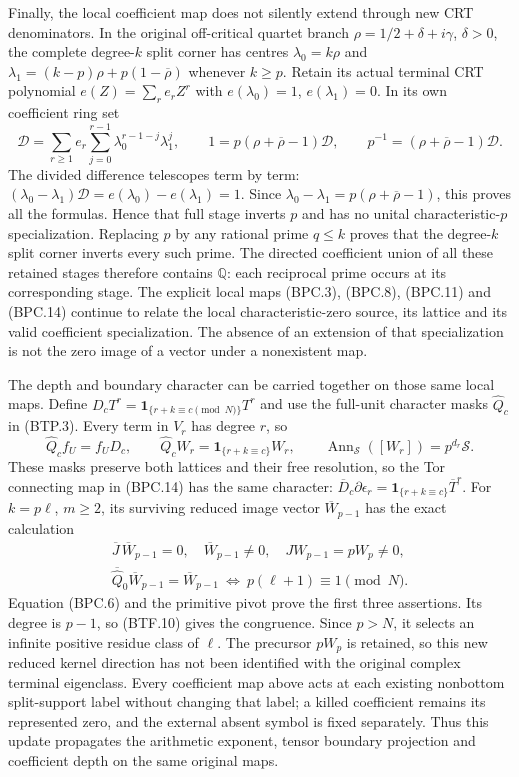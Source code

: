 Finally, the local coefficient map does not
silently extend through new CRT denominators.
In the original off-critical quartet branch
\(\rho=1/2+\delta+i\gamma\), \(\delta>0\),
the complete degree-\(k\) split corner has
centres \(\lambda_0=k\rho\) and
\(\lambda_1=(k-p)\rho+p(1-\overline\rho)\)
whenever \(k\geq p\).  Retain its actual
terminal CRT polynomial \(e(Z)=\sum_r e_rZ^r\)
with \(e(\lambda_0)=1\), \(e(\lambda_1)=0\).
In its own coefficient ring set
\[
 \mathscr D=\sum_{r\geq1}e_r
       \sum_{j=0}^{r-1}\lambda_0^{r-1-j}\lambda_1^j,
 \qquad
 1=p(\rho+\overline\rho-1)\mathscr D,
 \qquad p^{-1}=(\rho+\overline\rho-1)\mathscr D.
\tag{BTF.9}\label{eq:btf9}
\]
The divided difference telescopes term by term:
\((\lambda_0-\lambda_1)\mathscr D
=e(\lambda_0)-e(\lambda_1)=1\).
Since \(\lambda_0-\lambda_1
=p(\rho+\overline\rho-1)\), this proves all
the formulas.  Hence that full stage inverts
\(p\) and has no unital characteristic-\(p\)
specialization.  Replacing \(p\) by any
rational prime \(q\leq k\) proves that the
degree-\(k\) split corner inverts every such
prime.  The directed coefficient union of
all these retained stages therefore contains
\(\mathbb Q\): each reciprocal prime occurs
at its corresponding stage.  The explicit
local maps (BPC.3), (BPC.8), (BPC.11) and
(BPC.14) continue to relate the local
characteristic-zero source, its lattice and
its valid coefficient specialization.  The
absence of an extension of that specialization
is not the zero image of a vector under a
nonexistent map.

The depth and boundary character can be
carried together on those same local maps.
Define \(D_cT^r=\mathbf1_{\{r+k\equiv c\pmod N\}}T^r\)
and use the full-unit character masks
\(\widehat Q_c\) in (BTP.3).  Every term
in \(V_r\) has degree \(r\), so
\[
 \widehat Q_cf_U=f_UD_c,\qquad
 \widehat Q_cW_r=\mathbf1_{\{r+k\equiv c\}}W_r,
 \qquad \operatorname{Ann}_{\mathscr S}([W_r])=p^{d_r}\mathscr S.
\tag{BTF.10}\label{eq:btf10}
\]
These masks preserve both lattices and their
free resolution, so the Tor connecting map
in (BPC.14) has the same character:
\(\overline D_c\partial\epsilon_r
=\mathbf1_{\{r+k\equiv c\}}\overline T^r\).
For \(k=p\ell\), \(m\geq2\), its surviving
reduced image vector \(\overline W_{p-1}\)
has the exact calculation
\[
\begin{gathered}
 \overline J\,\overline W_{p-1}=0,
 \quad \overline W_{p-1}\ne0,
 \quad JW_{p-1}=pW_p\ne0,\\
 \overline{\widehat Q}_0\overline W_{p-1}
       =\overline W_{p-1}
 \ \Longleftrightarrow\ p(\ell+1)\equiv1\pmod N.
\end{gathered}
\tag{BTF.11}\label{eq:btf11}
\]
Equation (BPC.6) and the primitive pivot prove
the first three assertions.  Its degree is
\(p-1\), so (BTF.10) gives the congruence.
Since \(p>N\), it selects an infinite
positive residue class of \(\ell\).  The
precursor \(pW_p\) is retained, so this
new reduced kernel direction has not been
identified with the original complex
terminal eigenclass.  Every coefficient
map above acts at each existing nonbottom
split-support label without changing that
label; a killed coefficient remains its
represented zero, and the external absent
symbol is fixed separately.  Thus this
update propagates the arithmetic exponent,
tensor boundary projection and coefficient
depth on the same original maps.
